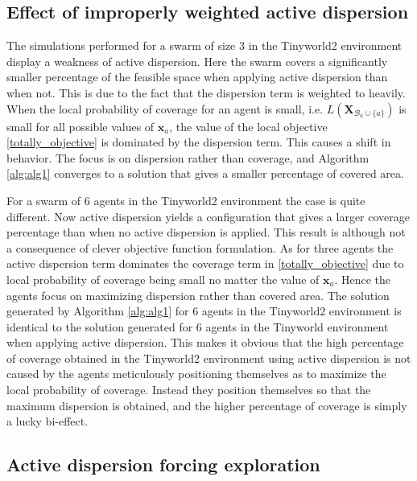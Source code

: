 \subsection{Effect of improperly weighted active dispersion}
The simulations performed for a swarm of size 3 in the Tinyworld2 environment display a weakness of active dispersion. Here the swarm covers a significantly smaller percentage of the 
feasible space when applying active dispersion than when not. This is due to the fact that the dispersion term is weighted to heavily. When the local probability of coverage for an agent is small, i.e. $L(\mathbf{X}_{\mathcal{B}_{a}\cup\{a\}})$ is small 
for all possible values of $\mathbf{x}_{a}$, the value of 
the local objective \eqref{totally_objective} is dominated by the dispersion term. This causes a shift in behavior. The focus is on dispersion rather than coverage, and Algorithm \ref{alg:alg1} converges
to a solution that gives a smaller percentage of covered area.

For a swarm of 6 agents in the Tinyworld2 environment the case is quite different. Now active dispersion yields a configuration that gives a larger coverage percentage than when no active
dispersion is applied. This result is although not a consequence of clever objective function formulation. As for three agents the active dispersion term dominates the coverage term
in \eqref{totally_objective} due to local probability of coverage being small no matter the value of $\mathbf{x}_{a}$. Hence the agents focus on maximizing dispersion rather than covered area. The 
solution generated by Algorithm \ref{alg:alg1} for 6 agents in the Tinyworld2 environment is identical to the solution generated for 6 agents in the Tinyworld environment when applying active dispersion. 
This makes it obvious that the high percentage of coverage obtained in the Tinyworld2 environment using active dispersion is not caused by the agents meticulously positioning themselves as to maximize the local
probability of coverage. Instead they position themselves so that the maximum dispersion is obtained, and the higher percentage of coverage is simply a lucky bi-effect.


\subsection{Active dispersion forcing exploration}

